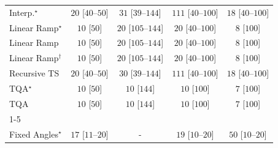 \begin{tabular}{l|cccc|}
Interp.$^\star$ & {\cellcolor[HTML]{F4FBF1}} \color[HTML]{000000} $20$ [$40$--$50$] & {\cellcolor[HTML]{F2FAEF}} \color[HTML]{000000} $31$ [$39$--$144$] & {\cellcolor[HTML]{E1F3DC}} \color[HTML]{000000} $111$ [$40$--$100$] & {\cellcolor[HTML]{F4FBF2}} \color[HTML]{000000} $18$ [$40$--$100$] \\
Linear Ramp$^\star$ & {\cellcolor[HTML]{F6FCF4}} \color[HTML]{000000} $10$ [$50$] & {\cellcolor[HTML]{F4FBF1}} \color[HTML]{000000} $20$ [$105$--$144$] & {\cellcolor[HTML]{F4FBF1}} \color[HTML]{000000} $20$ [$40$--$100$] & {\cellcolor[HTML]{F6FCF4}} \color[HTML]{000000} $8$ [$100$] \\
Linear Ramp & {\cellcolor[HTML]{F6FCF4}} \color[HTML]{000000} $10$ [$50$] & {\cellcolor[HTML]{F4FBF1}} \color[HTML]{000000} $20$ [$105$--$144$] & {\cellcolor[HTML]{F4FBF1}} \color[HTML]{000000} $20$ [$40$--$100$] & {\cellcolor[HTML]{F6FCF4}} \color[HTML]{000000} $8$ [$100$] \\
Linear Ramp$^\dagger$ & {\cellcolor[HTML]{F6FCF4}} \color[HTML]{000000} $10$ [$50$] & {\cellcolor[HTML]{F4FBF1}} \color[HTML]{000000} $20$ [$105$--$144$] & {\cellcolor[HTML]{F4FBF1}} \color[HTML]{000000} $20$ [$40$--$100$] & {\cellcolor[HTML]{F6FCF4}} \color[HTML]{000000} $8$ [$100$] \\
Recursive TS & {\cellcolor[HTML]{F4FBF1}} \color[HTML]{000000} $20$ [$40$--$50$] & {\cellcolor[HTML]{F2FAEF}} \color[HTML]{000000} $30$ [$39$--$144$] & {\cellcolor[HTML]{E1F3DC}} \color[HTML]{000000} $111$ [$40$--$100$] & {\cellcolor[HTML]{F4FBF2}} \color[HTML]{000000} $18$ [$40$--$100$] \\
TQA$^\star$ & {\cellcolor[HTML]{F6FCF4}} \color[HTML]{000000} $10$ [$50$] & {\cellcolor[HTML]{F6FCF4}} \color[HTML]{000000} $10$ [$144$] & {\cellcolor[HTML]{F6FCF4}} \color[HTML]{000000} $10$ [$100$] & {\cellcolor[HTML]{F6FCF4}} \color[HTML]{000000} $7$ [$100$] \\
TQA & {\cellcolor[HTML]{F6FCF4}} \color[HTML]{000000} $10$ [$50$] & {\cellcolor[HTML]{F6FCF4}} \color[HTML]{000000} $10$ [$144$] & {\cellcolor[HTML]{F6FCF4}} \color[HTML]{000000} $10$ [$100$] & {\cellcolor[HTML]{F6FCF4}} \color[HTML]{000000} $7$ [$100$] \\
\cline{1-5}
\multicolumn{5}{c}{\rule{0pt}{8pt}SV} \\
\midrule
Fixed Angles$^\star$ & {\cellcolor[HTML]{F4FBF2}} \color[HTML]{000000} $17$ [$11$--$20$] & {\cellcolor[HTML]{000000}} \color[HTML]{F1F1F1} {\cellcolor{white}} \color{black} - & {\cellcolor[HTML]{F4FBF2}} \color[HTML]{000000} $19$ [$10$--$20$] & {\cellcolor[HTML]{EEF8EA}} \color[HTML]{000000} $50$ [$10$--$20$] \\

\end{tabular}
